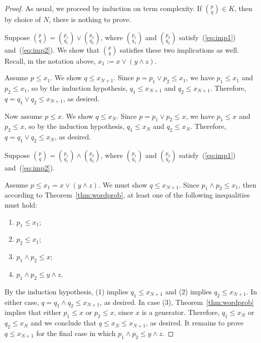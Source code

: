\begin{proof}
  As usual, we proceed by induction on term complexity.
If $\binom{p}{q} \in K$, then by choice of $N$, there is nothing to prove.

\medskip
{} Suppose $\binom{p}{q} = \binom{p_1}{q_1} \vee \binom{p_2}{q_2}$, where $\binom{p_1}{q_1}$ and $\binom{p_2}{q_2}$ satisfy~(\ref{eq:imp1}) and~(\ref{eq:imp2}). We show that $\binom{p}{q}$ satisfies these two implications as well.
Recall, in the notation above, $x_1:=x \vee (y \wedge z)$.


Assume $p\leqslant x_1$. We show $q \leq x_{N+1}$.
Since $p = p_1 \vee p_2 \leq x_1$, we have 
$p_1 \leqslant x_1$ and 
$p_2 \leqslant x_1$, so by the induction hypothesis,  
$q_1 \leqslant x_{N+1}$ and 
$q_2 \leqslant x_{N+1}$.  Therefore, $q = q_1 \vee q_2 \leq x_{N+1}$, as desired.

Now assume $p\leqslant x$. We show $q\leqslant x_N$. 
Since $p = p_1 \vee p_2 \leq x$, we have 
$p_1 \leqslant x$ and 
$p_2 \leqslant x$, so by the induction hypothesis,  
$q_1 \leqslant x_{N}$ and 
$q_2 \leqslant x_{N}$.  Therefore, $q = q_1 \vee q_2 \leq x_{N}$, as desired.


\medskip
{} Suppose $\binom{p}{q} = \binom{p_1}{q_1} \wedge \binom{p_2}{q_2}$, where $\binom{p_1}{q_1}$ and $\binom{p_2}{q_2}$ satisfy~(\ref{eq:imp1}) and~(\ref{eq:imp2}). 

Assume $p\leqslant x_1 = x \vee (y \wedge z)$. 
We must show $q\leqslant x_{N+1}$. 
Since $p_1 \wedge p_2 \leqslant x_1$, then according to Theorem~\ref{thm:wordprob}, at least one of the following inequalities must hold:
\begin{enumerate}
  \item $p_1 \leqslant x_1$;
  \item $p_2 \leqslant x_1$;
  \item $p_1 \wedge p_2 \leqslant x$;
  \item $p_1 \wedge p_2 \leqslant y \wedge z$.
\end{enumerate}
By the induction hypothesis, (1) implies $q_1 \leq x_{N+1}$  and (2) implies $q_2 \leq x_{N+1}$.  In either case, $q = q_1 \wedge q_2 \leq x_{N+1}$, as desired.  In case (3), Theorem~\ref{thm:wordprob} implies that either $p_1 \leq x$ or $p_2 \leq x$, since $x$ is a generator. Therefore, $q_1 \leq x_N$ or $q_2 \leq x_N$ and we conclude that 
$q \leq x_N \leq x_{N+1}$, as desired.  It remains to prove $q \leq x_{N+1}$ for the final case in which $p_1 \wedge p_2 \leq y \wedge z$. 


\end{proof}

